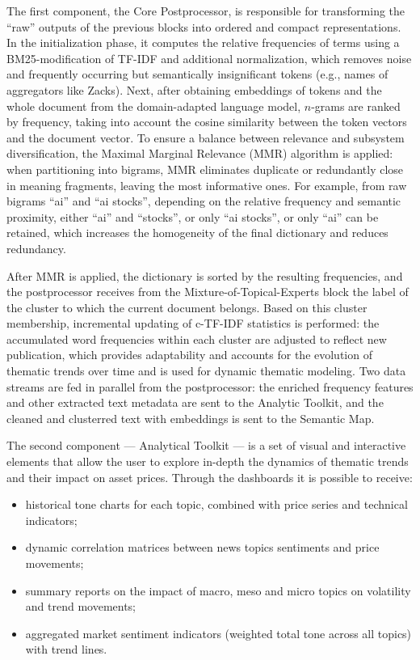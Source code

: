 The first component, the Core Postprocessor, is responsible for transforming the “raw” outputs
of the previous blocks into ordered and compact representations. In the initialization phase, it computes
the relative frequencies of terms using a BM25-modification of TF-IDF and additional normalization, which
removes noise and frequently occurring but semantically insignificant tokens (e.g., names of aggregators
like Zacks). Next, after obtaining embeddings of tokens and the whole document from the domain-adapted
language model, $n$-grams are ranked by frequency, taking into account the cosine similarity between
the token vectors and the document vector. To ensure a balance between relevance and subsystem
diversification, the Maximal Marginal Relevance (MMR) algorithm is applied: when partitioning into bigrams,
MMR eliminates duplicate or redundantly close in meaning fragments, leaving the most informative ones. For
example, from raw bigrams “ai” and “ai stocks”, depending on the relative frequency and semantic proximity,
either “ai” and “stocks”, or only “ai stocks”, or only “ai” can be retained, which increases the homogeneity
of the final dictionary and reduces redundancy.

After MMR is applied, the dictionary is sorted by the resulting frequencies, and the postprocessor receives
from the Mixture-of-Topical-Experts block the label of the cluster to which the current document belongs.
Based on this cluster membership, incremental updating of c-TF-IDF statistics is performed: the accumulated
word frequencies within each cluster are adjusted to reflect new publication, which provides adaptability
and accounts for the evolution of thematic trends over time and is used for dynamic thematic modeling. Two
data streams are fed in parallel from the postprocessor: the enriched frequency features and other extracted
text metadata are sent to the Analytic Toolkit, and the cleaned and clusterred text with embeddings is sent
to the Semantic Map.

The second component --- Analytical Toolkit --- is a set of visual and interactive elements that allow
the user to explore in-depth the dynamics of thematic trends and their impact on asset prices. Through
the dashboards it is possible to receive:

\begin{itemize}
    \item historical tone charts for each topic, combined with price series and technical indicators;
    \item dynamic correlation matrices between news topics sentiments and price movements;
    \item summary reports on the impact of macro, meso and micro topics on volatility and trend movements;
    \item aggregated market sentiment indicators (weighted total tone across all topics) with trend lines.
\end{itemize}


